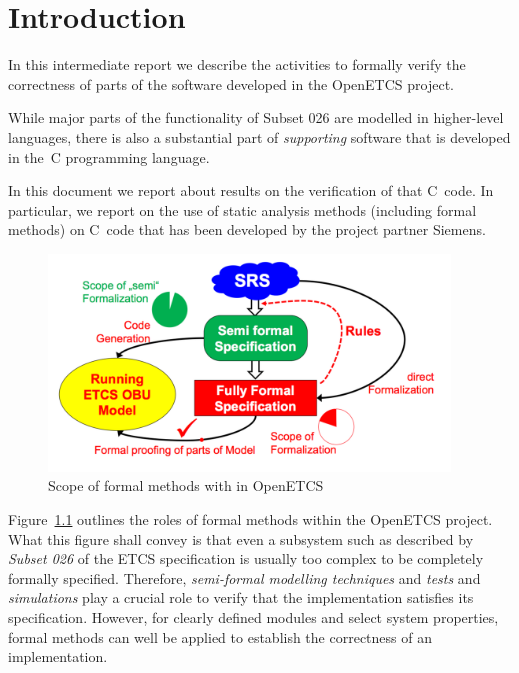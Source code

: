 
\chapter{Introduction}
\label{cha:intro}

In this intermediate report we describe the activities to formally verify
the correctness of parts of the software developed in the OpenETCS project.

While major parts of the functionality of {Subset 026} are modelled in 
higher-level languages, there is also a substantial part of \emph{supporting} software
that is developed in the~C programming language.

In this document we report about results on the verification of that C~code.
In particular, we report on the use of static analysis methods (including formal methods)
on C~code that has been developed by the project partner Siemens.

\begin{figure}[hbt]
\begin{center}
\includegraphics[width=0.95\textwidth]{figures/scope-of-formalization.pdf}
\caption{\label{fig:scope-of-formalization} Scope of formal methods with in OpenETCS}
\end{center}
\end{figure}

Figure~\ref{fig:scope-of-formalization} outlines the roles of formal methods
within the OpenETCS project.
What this figure shall convey is that even a subsystem such as described by
\emph{Subset 026} of the ETCS specification
is usually too complex to be completely formally specified.
Therefore, \emph{semi-formal modelling techniques} and \emph{tests} and 
\emph{simulations} play a crucial role to verify that the implementation
satisfies its specification.
However, for clearly defined modules and select system properties, formal methods
can well be applied to establish the correctness of an implementation.


